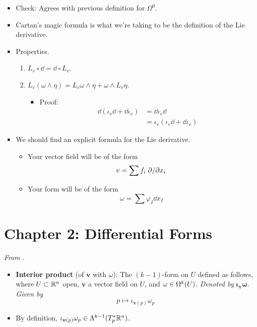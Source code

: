 \documentclass[../notes.tex]{subfiles}
\begin{document}
\begin{itemize}
\begin{itemize}
    \end{itemize}
    \item Check: Agrees with previous definition for $\Omega^0$.
    \item Cartan's magic formula is what we're taking to be the definition of the Lie derivative.
    \item Properties.
    \begin{enumerate}
        \item $L_v\circ\dd=\dd\circ L_v$.
        \item $L_v(\omega\wedge\eta)=L_v\omega\wedge\eta+\omega\wedge L_v\eta$.
        \begin{itemize}
            \item Proof:
            \begin{align*}
                \dd(\iota_v\dd+\dd\iota_v) &= \dd\iota_v\dd\\
                &= \iota_v(\iota_v\dd+\dd\iota_v)
            \end{align*}
        \end{itemize}
    \end{enumerate}
    \item We should find an explicit formula for the Lie derivative.
    \begin{itemize}
        \item Your vector field will be of the form
        \begin{equation*}
            v = \sum f_i\pdv*{x_i}
        \end{equation*}
        \item Your form will be of the form
        \begin{equation*}
            \omega = \sum\varphi_I\dd{x_I}
        \end{equation*}
    \end{itemize}
\end{itemize}



\section{Chapter 2: Differential Forms}
\emph{From \textcite{bib:DifferentialForms}.}
\begin{itemize}
    \item {}\textbf{Interior product} (of $\bm{v}$ with $\omega$): The $(k-1)$-form on $U$ defined as follows, where $U\subset\R^n$ open, $\bm{v}$ a vector field on $U$, and $\omega\in\ome[k]{U}$. \emph{Denoted by} $\bm{\iota_{\pmb{v}}\omega}$. \emph{Given by}
    \begin{equation*}
        p \mapsto \iota_{\bm{v}(p)}\omega_p
    \end{equation*}
    \item By definition, $\iota_{\bm{v}(p)}\omega_p\in\lam[k-1]{T_p^*\R^n}$.
\end{itemize}
\end{document}
